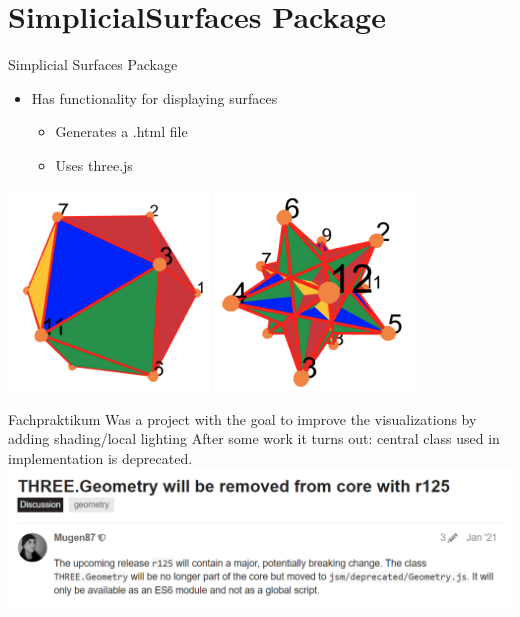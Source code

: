 \documentclass{beamer}
\numberwithin{equation}{aufgabe}
\begin{document}
\section{SimplicialSurfaces Package}
\begin{frame}{Simplicial Surfaces Package}
    \begin{itemize}[label=-]
        \item Has functionality for displaying surfaces
        \begin{itemize}[label=-]
            \item Generates a .html file
            \item Uses three.js
        \end{itemize}
    \end{itemize}
    \pause
    \begin{example}
        \includegraphics[width=0.4\textwidth]{images/ico-old.png}
        \includegraphics[width=0.4\textwidth]{images/ico2-1_old.png}
    \end{example}
\end{frame}

\begin{frame}
    \begin{exampleblock}{Fachpraktikum}
        Was a project with the goal to improve the visualizations by adding shading/local lighting
        \pause
        After some work it turns out: central class used in implementation is deprecated.
        \includegraphics[width=1\textwidth]{images/three-deprecated.png}
    \end{exampleblock}
\end{frame}
\end{document}
